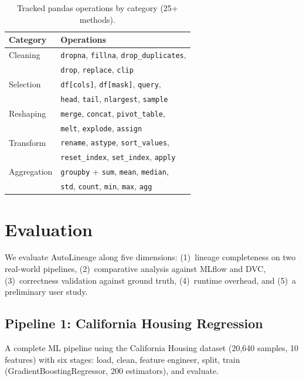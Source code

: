 \documentclass[10pt,twocolumn]{article}
\begin{document}
\begin{table}[t]
\centering
\caption{Tracked pandas operations by category (25+ methods).}
\label{tab:operations}
\small
\begin{tabular}{@{}ll@{}}
\toprule
\textbf{Category} & \textbf{Operations} \\
\midrule
Cleaning & \texttt{dropna}, \texttt{fillna}, \texttt{drop\_duplicates}, \\
         & \texttt{drop}, \texttt{replace}, \texttt{clip} \\
Selection & \texttt{df[cols]}, \texttt{df[mask]}, \texttt{query}, \\
          & \texttt{head}, \texttt{tail}, \texttt{nlargest}, \texttt{sample} \\
Reshaping & \texttt{merge}, \texttt{concat}, \texttt{pivot\_table}, \\
          & \texttt{melt}, \texttt{explode}, \texttt{assign} \\
Transform & \texttt{rename}, \texttt{astype}, \texttt{sort\_values}, \\
          & \texttt{reset\_index}, \texttt{set\_index}, \texttt{apply} \\
Aggregation & \texttt{groupby} + \texttt{sum}, \texttt{mean}, \texttt{median}, \\
            & \texttt{std}, \texttt{count}, \texttt{min}, \texttt{max}, \texttt{agg} \\
\bottomrule
\end{tabular}
\end{table}

\section{Evaluation}
\label{sec:eval}

We evaluate AutoLineage along five dimensions: (1)~lineage completeness on two real-world pipelines, (2)~comparative analysis against MLflow and DVC, (3)~correctness validation against ground truth, (4)~runtime overhead, and (5)~a preliminary user study.

\subsection{Pipeline 1: California Housing Regression}
\label{sec:pipeline1}

A complete ML pipeline using the California Housing dataset (20,640 samples, 10 features) with six stages: load, clean, feature engineer, split, train (GradientBoostingRegressor, 200 estimators), and evaluate.
\end{document}
